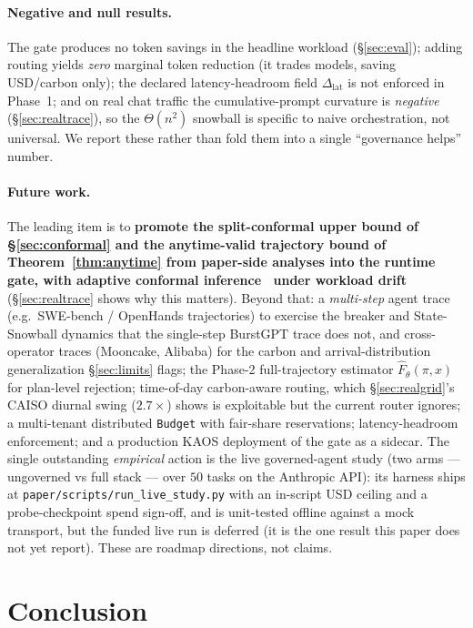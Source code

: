 \documentclass[11pt]{article}
\theoremstyle{plain}
\theoremstyle{definition}
\theoremstyle{remark}
\begin{document}
\paragraph{Negative and null results.} The gate produces no token savings in the headline workload (\S\ref{sec:eval}); adding routing yields \emph{zero} marginal token reduction (it trades models, saving USD/carbon only); the declared latency-headroom field $\Delta_{\mathrm{lat}}$ is not enforced in Phase~1; and on real chat traffic the cumulative-prompt curvature is \emph{negative} (\S\ref{sec:realtrace}), so the $\Theta(n^2)$ snowball is specific to naive orchestration, not universal. We report these rather than fold them into a single ``governance helps'' number.

\paragraph{Future work.} The leading item is to \textbf{promote the split-conformal upper bound of \S\ref{sec:conformal} and the anytime-valid trajectory bound of Theorem~\ref{thm:anytime} from paper-side analyses into the runtime gate, with adaptive conformal inference~\cite{gibbs2021} under workload drift} (\S\ref{sec:realtrace} shows why this matters). Beyond that: a \emph{multi-step} agent trace (e.g.\ SWE-bench / OpenHands trajectories) to exercise the breaker and State-Snowball dynamics that the single-step BurstGPT trace does not, and cross-operator traces (Mooncake, Alibaba) for the carbon and arrival-distribution generalization \S\ref{sec:limits} flags; the Phase-2 full-trajectory estimator $\hat F_\theta(\pi,x)$ for plan-level rejection; time-of-day carbon-aware routing, which \S\ref{sec:realgrid}'s CAISO diurnal swing ($2.7\times$) shows is exploitable but the current router ignores; a multi-tenant distributed \texttt{Budget} with fair-share reservations; latency-headroom enforcement; and a production KAOS deployment of the gate as a sidecar. The single outstanding \emph{empirical} action is the live governed-agent study (two arms --- ungoverned vs full stack --- over $50$ tasks on the Anthropic API): its harness ships at \texttt{paper/scripts/run\_live\_study.py} with an in-script USD ceiling and a probe-checkpoint spend sign-off, and is unit-tested offline against a mock transport, but the funded live run is deferred (it is the one result this paper does not yet report). These are roadmap directions, not claims.

\section{Conclusion}\label{sec:conclusion}
\end{document}
